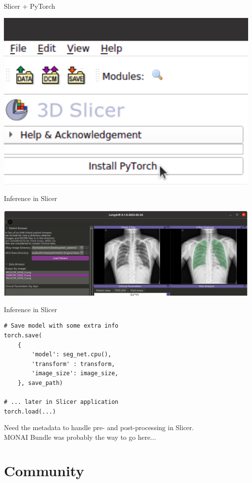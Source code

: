 \documentclass[10pt,aspectratio=169,dvipsnames]{beamer}
\begin{document}
\begin{frame}{Slicer + PyTorch}
\begin{center}
	\includegraphics[scale=0.4]{figures/slicer-pytorch2}
\end{center}
\end{frame}

\begin{frame}{Inference in Slicer}
\begin{center}
	\includegraphics[scale=0.4]{figures/lungair}
\end{center}
\end{frame}

\begin{frame}[fragile]{Inference in Slicer}
\begin{verbatim}
# Save model with some extra info
torch.save(
	{
		'model': seg_net.cpu(),
		'transform' : transform,
		'image_size': image_size,
	}, save_path)

# ... later in Slicer application
torch.load(...)
\end{verbatim}
Need the metadata to handle pre- and post-processing in Slicer.\\
MONAI Bundle was probably the way to go here...
\end{frame}




\section{Community}
\end{document}
